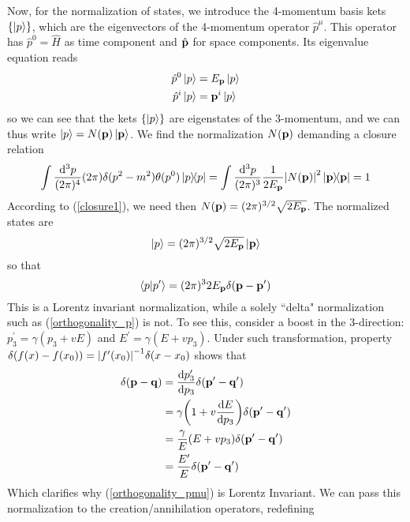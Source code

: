 Now, for the normalization of states, we introduce the 4-momentum basis kets $\{\ket{p}\}$, which are the eigenvectors of the 4-momentum operator $\hat{p}^\mu$. This operator has $\hat{p}^0=\hat{H}$ as time component and $\hat{\vb{p}}$ for space components. Its eigenvalue equation reads
\begin{equation}
    \begin{aligned}
    \hat{p}^0\ket{p}&=E_{\vb{p}}\ket{p}\\
    \hat{{p}}^i\ket{p}&={\vb{p}}^i\ket{p}
    \end{aligned}
\end{equation}
so we can see that the kets $\{\ket{p}\}$ are eigenstates of the 3-momentum, and we can thus write $\ket{p}=N(\vb{p})\ket{\vb{p}}$. We find the normalization $N(\vb{p})$ demanding a closure relation 
\begin{equation}
    \int\frac{\dd^3p}{(2\pi)^4}(2\pi)\delta(p^2-m^2)\theta(p^0)\dyad{p}=\int\frac{\dd^3p}{(2\pi)^3}\frac{1}{2E_{\vb{p}}}\abs{N(\vb{p})}^2\dyad{\vb{p}}=1
\end{equation}
According to (\ref{closure1}), we need then $N(\vb{p})=(2\pi)^{3/2}\sqrt{2E_{\vb{p}}}$. The normalized states are
\begin{equation}
    \ket{p}=(2\pi)^{3/2}\sqrt{2E_{\vb{p}}}\ket{\vb{p}}
\end{equation}
so that
\begin{equation}
    \braket{p}{p^\prime}=(2\pi)^32E_{\vb{p}}\delta(\vb{p}-\vb{p}^\prime)
    \label{orthogonality_pmu}
\end{equation}
This is a Lorentz invariant normalization, while a solely ``delta" normalization such as (\ref{orthogonality_p}) is not. To see this, consider a boost in the 3-direction: $p^\prime_3=\gamma(p_3+vE)$ and $E^\prime=\gamma(E+vp_3)$. Under such transformation, property $\delta(f(x)-f(x_0))=\abs{f^\prime(x_0)}^{-1}\delta(x-x_0)$ shows that
\begin{equation}
\begin{aligned}
    \delta(\vb{p}-\vb{q})&=\dv{p^\prime_3}{p_3}\delta(\vb{p}^\prime-\vb{q}^\prime)\\
    &=\gamma\qty(1+v\dv{E}{p_3})\delta(\vb{p}^\prime-\vb{q}^\prime)\\
    &=\frac{\gamma}{E}(E+vp_3)\delta(\vb{p}^\prime-\vb{q}^\prime)\\
    &=\frac{E^\prime}{E}\delta(\vb{p}^\prime-\vb{q}^\prime)
\end{aligned}
\end{equation}
Which clarifies why (\ref{orthogonality_pmu}) is Lorentz Invariant. We can pass this normalization to the creation/annihilation operators, redefining
